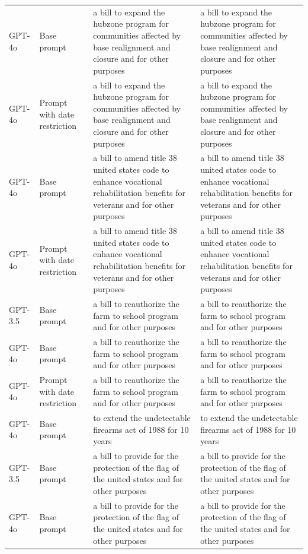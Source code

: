 \begin{longtable}{>{\raggedright\arraybackslash}p{1.4cm}>{\raggedright\arraybackslash}p{1.4cm}>{\raggedright\arraybackslash}p{5.5cm}>{\raggedright\arraybackslash}p{5.5cm}}
GPT-4o & Base prompt & a bill to expand the hubzone program for communities affected by base realignment and closure and for other purposes & a bill to expand the hubzone program for communities affected by base realignment and closure and for other purposes\\
GPT-4o & Prompt with date restriction & a bill to expand the hubzone program for communities affected by base realignment and closure and for other purposes & a bill to expand the hubzone program for communities affected by base realignment and closure and for other purposes\\
GPT-4o & Base prompt & a bill to amend title 38 united states code to enhance vocational rehabilitation benefits for veterans and for other purposes & a bill to amend title 38 united states code to enhance vocational rehabilitation benefits for veterans and for other purposes\\
GPT-4o & Prompt with date restriction & a bill to amend title 38 united states code to enhance vocational rehabilitation benefits for veterans and for other purposes & a bill to amend title 38 united states code to enhance vocational rehabilitation benefits for veterans and for other purposes\\
GPT-3.5 & Base prompt & a bill to reauthorize the farm to school program and for other purposes & a bill to reauthorize the farm to school program and for other purposes\\
GPT-4o & Base prompt & a bill to reauthorize the farm to school program and for other purposes & a bill to reauthorize the farm to school program and for other purposes\\
GPT-4o & Prompt with date restriction & a bill to reauthorize the farm to school program and for other purposes & a bill to reauthorize the farm to school program and for other purposes\\
GPT-4o & Base prompt & to extend the undetectable firearms act of 1988 for 10 years & to extend the undetectable firearms act of 1988 for 10 years\\
GPT-3.5 & Base prompt & a bill to provide for the protection of the flag of the united states and for other purposes & a bill to provide for the protection of the flag of the united states and for other purposes\\
GPT-4o & Base prompt & a bill to provide for the protection of the flag of the united states and for other purposes & a bill to provide for the protection of the flag of the united states and for other purposes\\

\end{longtable}
